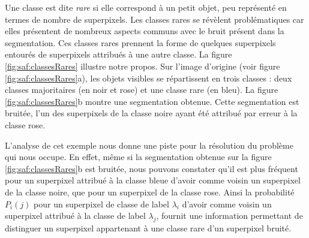 Une classe est dite \emph{ rare} si elle correspond à un petit objet, peu représenté en termes de nombre de superpixels. Les classes rares se révèlent problématiques car elles présentent de nombreux aspects communs avec le bruit présent dans la segmentation. Ces classes rares prennent la forme de quelques superpixels entourés de superpixels attribués à une autre classe. La figure \ref{fig:saf:classesRares} illustre notre propos. Sur l'image d'origine (voir  figure \ref{fig:saf:classesRares}a), les objets visibles se répartissent en trois classes : deux classes majoritaires (en noir et rose) et une classe rare (en bleu). La figure \ref{fig:saf:classesRares}b montre une segmentation obtenue. Cette segmentation est bruitée, l'un des superpixels de la classe noire ayant été attribué par erreur à la classe rose. 

L'analyse de cet exemple nous donne une piste pour la résolution du problème qui nous occupe. En effet, même si la segmentation obtenue sur la figure \ref{fig:saf:classesRares}b est bruitée, nous pouvons constater qu'il est plus fréquent pour un superpixel attribué à la classe bleue d'avoir comme voisin un superpixel de la classe noire, que pour un superpixel de la classe rose. Ainsi la probabilité $P_{i}(j)$ pour un superpixel de classe de label $\lambda_{i}$ d'avoir comme voisin un superpixel attribué à la classe de label $\lambda_{j}$, fournit une information permettant de distinguer un superpixel appartenant à une classe rare d'un superpixel bruité.

